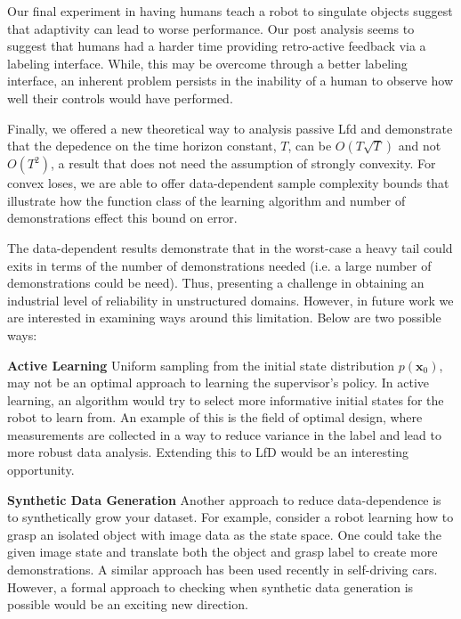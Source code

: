 \documentclass[10pt, conference]{ieeeconf}      %
\newcommand{\bx}{\mathbf{x}}
\begin{document}
Our final experiment in having humans teach a robot to singulate objects suggest that adaptivity can lead to worse performance. Our post analysis seems to suggest that humans had a harder time providing retro-active feedback via a labeling interface. While, this may be overcome through a better labeling interface, an inherent problem persists in the inability of a human to observe how well their controls would have performed. 

Finally, we offered a new theoretical  way to analysis passive Lfd and demonstrate that the depedence on the time horizon constant, $T$, can be $O(T\sqrt{T})$ and not $O(T^2)$, a result that does not need the assumption of strongly convexity.  For convex loses, we are able to offer data-dependent sample complexity bounds that illustrate how the function class of the learning algorithm and number of demonstrations effect this bound on error. 

The data-dependent results demonstrate that in the worst-case a heavy tail could exits in terms of the number of demonstrations needed (i.e. a large number of demonstrations could be need). Thus, presenting a challenge in obtaining an industrial level of reliability in unstructured domains. However, in future work we are interested in examining ways around this limitation. Below are two possible ways:

\noindent \textbf{Active Learning} Uniform sampling from the initial state distribution $p(\bx_0)$, may not be an optimal approach to learning the supervisor's policy. In active learning, an algorithm would try to select more informative initial states for the robot to learn from. An example of this is the field of optimal design, where measurements are collected in a way to reduce variance in the label and lead to more robust data analysis. Extending this to LfD would be an interesting opportunity. 

\noindent \textbf{Synthetic Data Generation} Another approach to reduce data-dependence is to synthetically grow your dataset. For example, consider a robot learning how to grasp an isolated object  with image data as the state space. One could take the given image state and translate both the object and grasp label to create more demonstrations. A similar approach has been used recently in self-driving cars. However, a formal approach to checking when synthetic data generation is possible would be an exciting new direction. 



\end{document}
